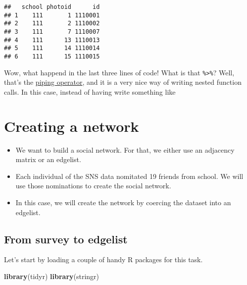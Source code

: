 \documentclass[]{book}
\newenvironment{Shaded}{\begin{snugshade}}{\end{snugshade}}
\newcommand{\KeywordTok}[1]{\textcolor[rgb]{0.13,0.29,0.53}{\textbf{#1}}}
\newcommand{\DataTypeTok}[1]{\textcolor[rgb]{0.13,0.29,0.53}{#1}}
\newcommand{\DecValTok}[1]{\textcolor[rgb]{0.00,0.00,0.81}{#1}}
\newcommand{\StringTok}[1]{\textcolor[rgb]{0.31,0.60,0.02}{#1}}
\newcommand{\OperatorTok}[1]{\textcolor[rgb]{0.81,0.36,0.00}{\textbf{#1}}}
\newcommand{\NormalTok}[1]{#1}
\theoremstyle{definition}
\theoremstyle{definition}
\theoremstyle{definition}
\theoremstyle{remark}
\begin{document}
\begin{verbatim}
##   school photoid      id
## 1    111       1 1110001
## 2    111       2 1110002
## 3    111       7 1110007
## 4    111      13 1110013
## 5    111      14 1110014
## 6    111      15 1110015
\end{verbatim}

Wow, what happend in the last three lines of code! What is that
\texttt{\%\textgreater{}\%}? Well, that's the
\href{http://r4ds.had.co.nz/pipes.html}{piping operator}, and it is a
very nice way of writing nested function calls. In this case, instead of
having write something like

\begin{Shaded}
\end{Shaded}

\section{Creating a network}\label{creating-a-network}

\begin{itemize}
\item
  We want to build a social network. For that, we either use an
  adjacency matrix or an edgelist.
\item
  Each individual of the SNS data nomitated 19 friends from school. We
  will use those nominations to create the social network.
\item
  In this case, we will create the network by coercing the dataset into
  an edgelist.
\end{itemize}

\subsection{From survey to edgelist}\label{from-survey-to-edgelist}

Let's start by loading a couple of handy R packages for this task.

\begin{Shaded}
\begin{Highlighting}[]
\KeywordTok{library}\NormalTok{(tidyr)}
\KeywordTok{library}\NormalTok{(stringr)}
\end{Highlighting}
\end{Shaded}
\end{document}
